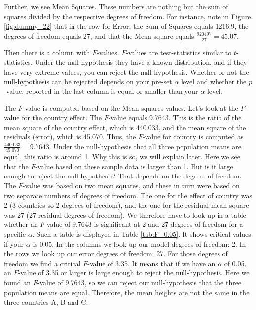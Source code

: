 \documentclass[]{book}\usepackage[]{graphicx}\usepackage[]{color}
\begin{document}
Further, we see Mean Squares. These numbers are nothing but the sum of squares divided by the respective degrees of freedom. For instance, note in Figure \ref{fig:dummy_22} that in the row for Error, the Sum of Squares equals 1216.9, the degrees of freedom equals 27, and that the Mean square equals $\frac{920497}{27}=45.07$. 

Then there is a column with $F$-values. $F$-values are test-statistics similar to $t$-statistics. Under the null-hypothesis they have a known distribution, and if they have very extreme values, you can reject the null-hypothesis. Whether or not the null-hypothesis can be rejected depends on your pre-set $\alpha$ level and whether the $p$-value, reported in the last column is equal or smaller than your $\alpha$ level.

The $F$-value is computed based on the Mean squares values. Let's look at the $F$-value for the country effect. The $F$-value equals 9.7643. This is the ratio of the mean square of the country effect, which is 440.033, and the mean square of the residuals (error), which is 45.070. Thus, the $F$-value for country is computed as $\frac{440.033}{45.070}=9.7643$. Under the null-hypothesis that all three population means are equal, this ratio is around 1. Why this is so, we will explain later. Here we see that the $F$-value based on these sample data is larger than 1. But is it large enough to reject the null-hypothesis? That depends on the degrees of freedom. The $F$-value was based on two mean squares, and these in turn were based on two separate numbers of degrees of freedom. The one for the effect of country was 2 (3 countries so 2 degrees of freedom), and the one for the residual mean square was 27 (27 residual degrees of freedom). We therefore have to look up in a table whether an $F$-value of 9.7643 is significant at 2 and 27 degrees of freedom for a specific $\alpha$. Such a table is displayed in Table \ref{tab:F_0.05}. It shows critical values if your $\alpha$ is 0.05. In the columns we look up our model degrees of freedom: 2. In the rows we look up our error degrees of freedom: 27. For those degrees of freedom we find a critical $F$-value of 3.35. It means that if we have an $\alpha$ of 0.05, an $F$-value of 3.35 or larger is large enough to reject the null-hypothesis. Here we found an $F$-value of 9.7643, so we can reject our null-hypothesis that the three population means are equal. Therefore, the mean heights are not the same in the three countries A, B and C. 
\end{document}
